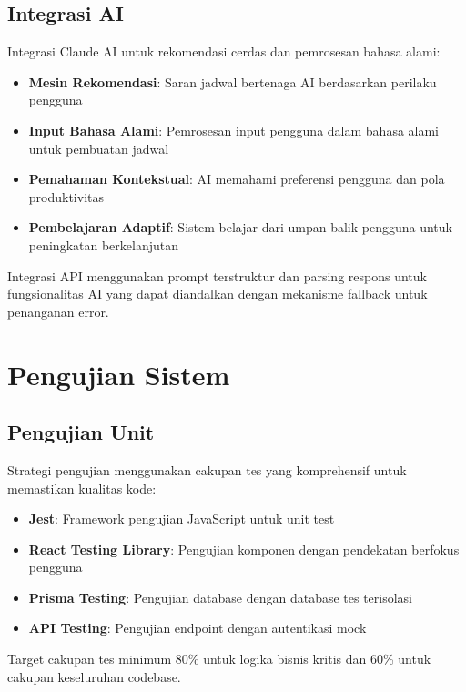 \subsection{Integrasi AI}

Integrasi Claude AI untuk rekomendasi cerdas dan pemrosesan bahasa alami:

\begin{itemize}
\item \textbf{Mesin Rekomendasi}: Saran jadwal bertenaga AI berdasarkan perilaku pengguna
\item \textbf{Input Bahasa Alami}: Pemrosesan input pengguna dalam bahasa alami untuk pembuatan jadwal
\item \textbf{Pemahaman Kontekstual}: AI memahami preferensi pengguna dan pola produktivitas
\item \textbf{Pembelajaran Adaptif}: Sistem belajar dari umpan balik pengguna untuk peningkatan berkelanjutan
\end{itemize}

Integrasi API menggunakan prompt terstruktur dan parsing respons untuk fungsionalitas AI yang dapat diandalkan dengan mekanisme fallback untuk penanganan error.

\section{Pengujian Sistem}

\subsection{Pengujian Unit}

Strategi pengujian menggunakan cakupan tes yang komprehensif untuk memastikan kualitas kode:

\begin{itemize}
\item \textbf{Jest}: Framework pengujian JavaScript untuk unit test
\item \textbf{React Testing Library}: Pengujian komponen dengan pendekatan berfokus pengguna
\item \textbf{Prisma Testing}: Pengujian database dengan database tes terisolasi
\item \textbf{API Testing}: Pengujian endpoint dengan autentikasi mock
\end{itemize}

Target cakupan tes minimum 80\% untuk logika bisnis kritis dan 60\% untuk cakupan keseluruhan codebase.

